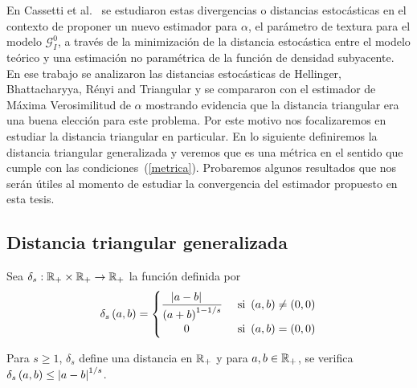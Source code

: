 En Cassetti et al.~\cite{APSAR2013ParameterEstimationStochasticDistances} se estudiaron estas divergencias o distancias estocásticas en el contexto de proponer un nuevo estimador para $\alpha$, el parámetro de textura para el modelo $\mathcal{G}_I^0$, a través de la minimización de la distancia estocástica entre el modelo teórico y una estimación no paramétrica de la función de densidad subyacente. En ese trabajo se analizaron las distancias estocásticas de Hellinger, Bhattacharyya, R\'enyi and Triangular y se compararon con el estimador de Máxima Verosimilitud de $\alpha$ mostrando evidencia que la distancia triangular era una buena elección para este problema. Por este motivo nos focalizaremos en estudiar la distancia triangular en particular. En lo siguiente definiremos la distancia triangular generalizada y veremos que es una métrica en el sentido que cumple con las condiciones~(\ref{metrica}). Probaremos algunos resultados que nos serán útiles al momento de estudiar la convergencia del estimador propuesto en esta tesis.

\subsection{Distancia triangular generalizada}

Sea $\delta_{s}:\mathbb{R}_{+}\times\mathbb{R}_{+}\to\mathbb{R}_{+}$ la función definida por
\begin{align*}
\delta_{s}\left( a,b \right) = 
\begin{cases}
\dfrac{\left| a - b \right|\ \ \ }{\left( a + b \right)^{1-1/s}} & \text{ si } \left( a,b \right) \ne \left( 0,0 \right) \\
\qquad 0 &  \text{ si } \left( a,b \right) = \left( 0,0 \right)
\end{cases}
\end{align*}

\begin{lemma}
	Para $s\ge 1$, $\delta_{s}$ define una distancia en $\mathbb{R}_{+}$ y para $a,b\in\mathbb{R}_{+}$, se verifica $\delta_{s}\left( a,b \right) \le \left| a-b \right|^{1/s}$.
\end{lemma}

